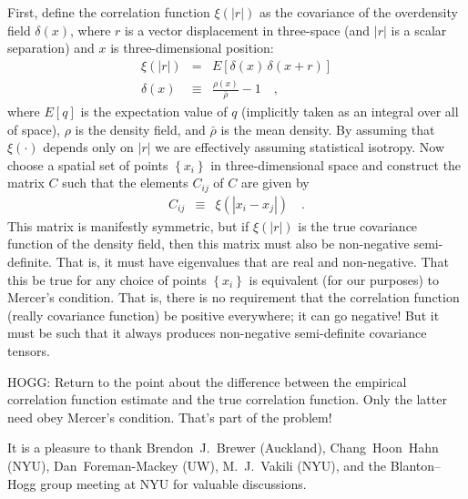 \documentclass[12pt, letterpaper, preprint]{aastex}
\newcommand{\setof}[1]{\left\{{#1}\right\}}
\begin{document}
First, define the correlation function $\xi(|r|)$ as the covariance of
the overdensity field $\delta(x)$, where $r$ is a vector displacement
in three-space (and $|r|$ is a scalar separation) and $x$ is
three-dimensional position:
\begin{eqnarray}
\xi(|r|) &=& E[\delta(x)\,\delta(x+r)]
\\
\delta(x) &\equiv& \frac{\rho(x)}{\bar{\rho}} - 1
\quad ,
\end{eqnarray}
where $E[q]$ is the expectation value of $q$ (implicitly taken as an integral
over all of space),
$\rho$ is the density field,
and $\bar{\rho}$ is the mean density.
By assuming that $\xi(\cdot)$ depends only on $|r|$ we are effectively
assuming statistical isotropy.
Now choose a spatial set of points $\setof{x_i}$ in three-dimensional space
and construct the matrix $C$ such that the elements $C_{ij}$ of $C$
are given by
\begin{eqnarray}
C_{ij} &\equiv& \xi(|x_i - x_j|)
\quad .
\end{eqnarray}
This matrix is manifestly symmetric, but if $\xi(|r|)$ is the true
covariance function of the density field, then this matrix must also
be non-negative semi-definite.
That is, it must have eigenvalues that are real and non-negative.
That this be true for any choice of points $\setof{x_i}$ is equivalent
(for our purposes) to Mercer's condition.
That is, there is no requirement that the correlation function (really
covariance function) be positive everywhere; it can go negative!
But it must be such that it always produces non-negative semi-definite
covariance tensors.

HOGG: Return to the point about the difference between the empirical
correlation function estimate and the true correlation function. Only the
latter need obey Mercer's condition. That's part of the problem!

\acknowledgements
It is a pleasure to thank
  Brendon~J.~Brewer (Auckland),
  Chang~Hoon~Hahn (NYU),
  Dan~Foreman-Mackey (UW),
  M.~J.~Vakili (NYU),
  and the Blanton--Hogg group meeting at NYU
for valuable discussions.
\end{document}
